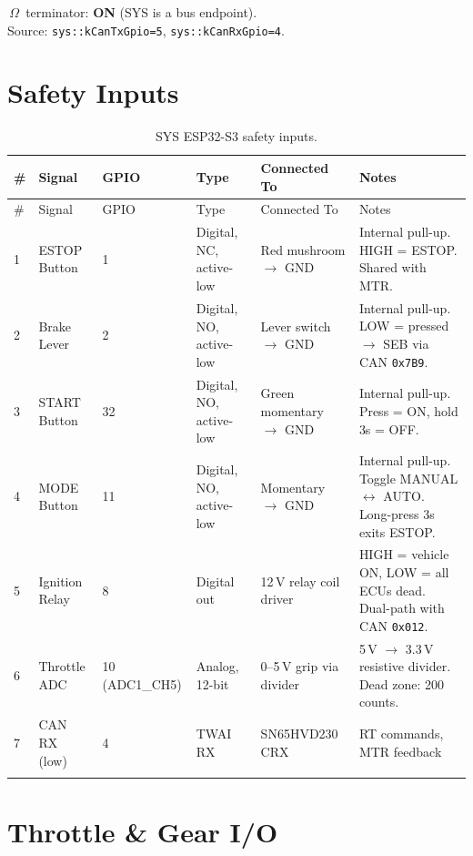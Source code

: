 \documentclass[12pt,a4paper,oneside]{report}
\newcommand{\canid}[1]{\texttt{0x#1}}
\begin{document}
\,$\Omega$\ terminator: \textbf{ON} (SYS is a bus endpoint).\\
Source: \texttt{sys::kCanTxGpio=5}, \texttt{sys::kCanRxGpio=4}.

\section{Safety Inputs}

\begin{center}
\begin{longtable}{p{4mm} p{28mm} p{8mm} p{28mm} p{28mm} p{58mm}}
\toprule
\# & Signal & GPIO & Type & Connected To & Notes \\
\midrule
\endfirsthead
\toprule
\# & Signal & GPIO & Type & Connected To & Notes \\
\midrule
\endhead
1 & ESTOP Button  & 1  & Digital, NC, active-low & Red mushroom $\rightarrow$ GND & Internal pull-up. HIGH = ESTOP. Shared with MTR. \\
2 & Brake Lever   & 2  & Digital, NO, active-low & Lever switch $\rightarrow$ GND & Internal pull-up. LOW = pressed $\rightarrow$ SEB via CAN \canid{7B9}. \\
3 & START Button  & 32 & Digital, NO, active-low & Green momentary $\rightarrow$ GND & Internal pull-up. Press = ON, hold 3s = OFF. \\
4 & MODE Button   & 11 & Digital, NO, active-low & Momentary $\rightarrow$ GND & Internal pull-up. Toggle MANUAL $\leftrightarrow$ AUTO. Long-press 3s exits ESTOP. \\
5 & Ignition Relay & 8 & Digital out & 12\,V relay coil driver & HIGH = vehicle ON, LOW = all ECUs dead. Dual-path with CAN \canid{012}. \\
6 & Throttle ADC  & 10 (ADC1\_CH5) & Analog, 12-bit & 0--5\,V grip via divider & 5\,V $\rightarrow$ 3.3\,V resistive divider. Dead zone: 200 counts. \\
7 & CAN RX (low)  & 4  & TWAI RX & SN65HVD230 CRX & RT commands, MTR feedback \\
\bottomrule
\caption{SYS ESP32-S3 safety inputs.}
\end{longtable}
\end{center}

\section{Throttle \& Gear I/O}
\end{document}
